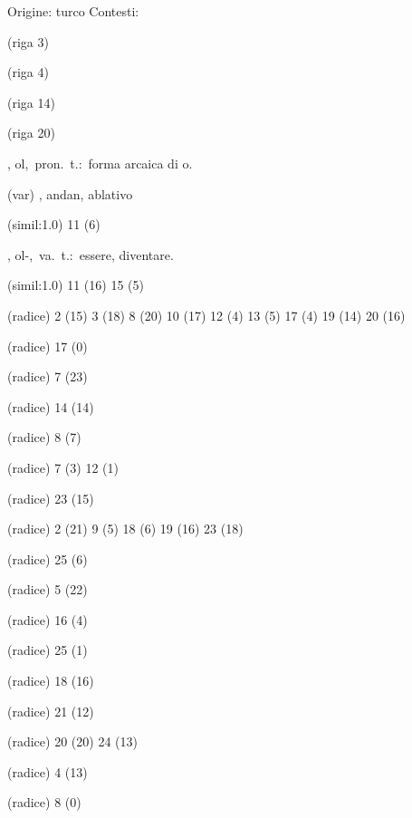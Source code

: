 \begin{glossario}{Origine: turco}
Contesti:
\begin{subvocedue}
\item[(riga 3)] 
\item[(riga 4)] 
\item[(riga 14)] 
\item[(riga 20)] 
\end{subvocedue}
\item[{\color{colorlowref}\spzrl{.Ql}},] {\sf ol},\ pron.\ t.:\ forma arcaica di o.
\begin{subvocedue}
\item[(var)] , {\sf andan}, ablativo\item[(simil:1.0)]   11 (6)
\end{subvocedue}
\item[{\color{colorlowref}\spzrl{.QlB}},] {\sf ol-},\ va.\ t.:\ essere, diventare.
\begin{subvocedue}
\item[(simil:1.0)]   11 (16) 15 (5)
\item[(radice)]   2 (15) 3 (18) 8 (20) 10 (17) 12 (4) 13 (5) 17 (4) 19 (14) 20 (16)
\item[(radice)]   17 (0)
\item[(radice)]   7 (23)
\item[(radice)]   14 (14)
\item[(radice)]   8 (7)
\item[(radice)]   7 (3) 12 (1)
\item[(radice)]   23 (15)
\item[(radice)]   2 (21) 9 (5) 18 (6) 19 (16) 23 (18)
\item[(radice)]   25 (6)
\item[(radice)]   5 (22)
\item[(radice)]   16 (4)
\item[(radice)]   25 (1)
\item[(radice)]   18 (16)
\item[(radice)]   21 (12)
\item[(radice)]   20 (20) 24 (13)
\item[(radice)]   4 (13)
\item[(radice)]   8 (0)

\end{subvocedue}
\end{glossario}
